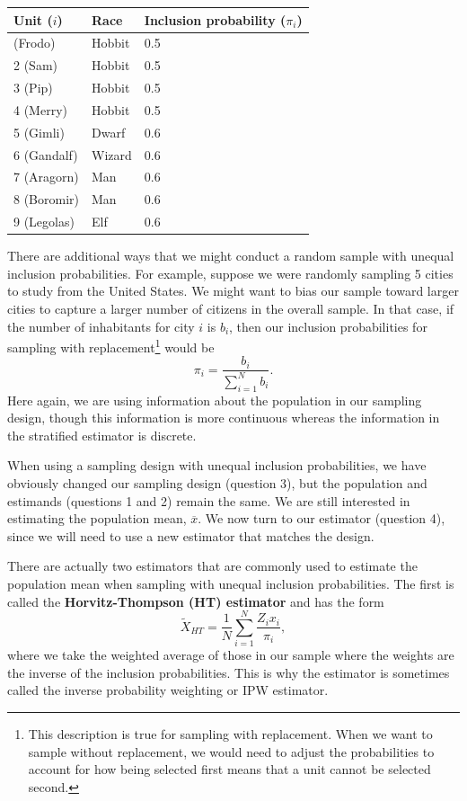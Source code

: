 \documentclass[
  letterpaper,
  DIV=11,
  numbers=noendperiod]{scrreprt}
\theoremstyle{definition}
\theoremstyle{definition}
\theoremstyle{plain}
\theoremstyle{remark}
\begin{document}
\begin{longtable}[]{@{}lll@{}}
\toprule\noalign{}
Unit (\(i\)) & Race & Inclusion probability (\(\pi_i\)) \\
\midrule\noalign{}
\endhead
\bottomrule\noalign{}
\endlastfoot
1 (Frodo) & Hobbit & 0.5 \\
2 (Sam) & Hobbit & 0.5 \\
3 (Pip) & Hobbit & 0.5 \\
4 (Merry) & Hobbit & 0.5 \\
5 (Gimli) & Dwarf & 0.6 \\
6 (Gandalf) & Wizard & 0.6 \\
7 (Aragorn) & Man & 0.6 \\
8 (Boromir) & Man & 0.6 \\
9 (Legolas) & Elf & 0.6 \\
\end{longtable}

There are additional ways that we might conduct a random sample with
unequal inclusion probabilities. For example, suppose we were randomly
sampling 5 cities to study from the United States. We might want to bias
our sample toward larger cities to capture a larger number of citizens
in the overall sample. In that case, if the number of inhabitants for
city \(i\) is \(b_i\), then our inclusion probabilities for sampling
with replacement\footnote{This description is true for sampling with
  replacement. When we want to sample without replacement, we would need
  to adjust the probabilities to account for how being selected first
  means that a unit cannot be selected second.} would be \[
\pi_i = \frac{b_i}{\sum_{i=1}^N b_i}.
\] Here again, we are using information about the population in our
sampling design, though this information is more continuous whereas the
information in the stratified estimator is discrete.

When using a sampling design with unequal inclusion probabilities, we
have obviously changed our sampling design (question 3), but the
population and estimands (questions 1 and 2) remain the same. We are
still interested in estimating the population mean, \(\overline{x}\). We
now turn to our estimator (question 4), since we will need to use a new
estimator that matches the design.

There are actually two estimators that are commonly used to estimate the
population mean when sampling with unequal inclusion probabilities. The
first is called the \textbf{Horvitz-Thompson (HT) estimator} and has the
form \[ 
\widetilde{X}_{HT} = \frac{1}{N} \sum_{i=1}^{N} \frac{Z_{i}x_{i}}{\pi_{i}},
\] where we take the weighted average of those in our sample where the
weights are the inverse of the inclusion probabilities. This is why the
estimator is sometimes called the inverse probability weighting or IPW
estimator.
\end{document}
